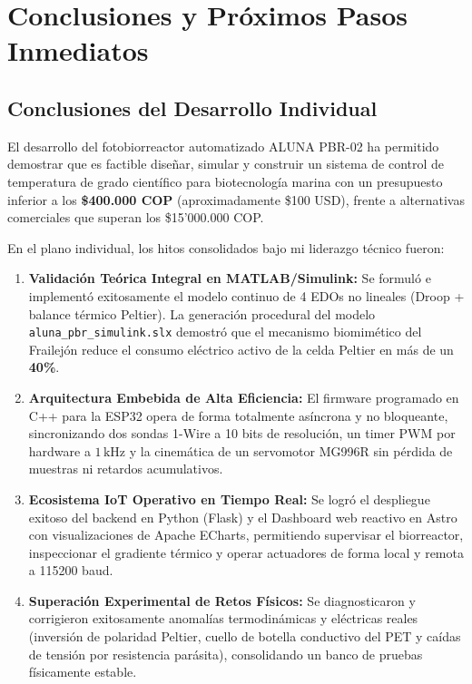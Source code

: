 \section{Conclusiones y Próximos Pasos Inmediatos}

\subsection{Conclusiones del Desarrollo Individual}
El desarrollo del fotobiorreactor automatizado ALUNA PBR-02 ha permitido demostrar que es factible diseñar, simular y construir un sistema de control de temperatura de grado científico para biotecnología marina con un presupuesto inferior a los \textbf{\$400.000 COP} (aproximadamente \$100 USD), frente a alternativas comerciales que superan los \$15'000.000 COP.

En el plano individual, los hitos consolidados bajo mi liderazgo técnico fueron:
\begin{enumerate}[itemsep=2pt, topsep=3pt, parsep=1pt]
    \item \textbf{Validación Teórica Integral en MATLAB/Simulink:} Se formuló e implementó exitosamente el modelo continuo de 4 EDOs no lineales (Droop + balance térmico Peltier). La generación procedural del modelo \texttt{aluna\_pbr\_simulink.slx} demostró que el mecanismo biomimético del Frailejón reduce el consumo eléctrico activo de la celda Peltier en más de un \textbf{40\%}.
    \item \textbf{Arquitectura Embebida de Alta Eficiencia:} El firmware programado en C++ para la ESP32 opera de forma totalmente asíncrona y no bloqueante, sincronizando dos sondas 1-Wire a 10 bits de resolución, un timer PWM por hardware a $1\,\text{kHz}$ y la cinemática de un servomotor MG996R sin pérdida de muestras ni retardos acumulativos.
    \item \textbf{Ecosistema IoT Operativo en Tiempo Real:} Se logró el despliegue exitoso del backend en Python (Flask) y el Dashboard web reactivo en Astro con visualizaciones de Apache ECharts, permitiendo supervisar el biorreactor, inspeccionar el gradiente térmico y operar actuadores de forma local y remota a 115200 baud.
    \item \textbf{Superación Experimental de Retos Físicos:} Se diagnosticaron y corrigieron exitosamente anomalías termodinámicas y eléctricas reales (inversión de polaridad Peltier, cuello de botella conductivo del PET y caídas de tensión por resistencia parásita), consolidando un banco de pruebas físicamente estable.
\end{enumerate}

